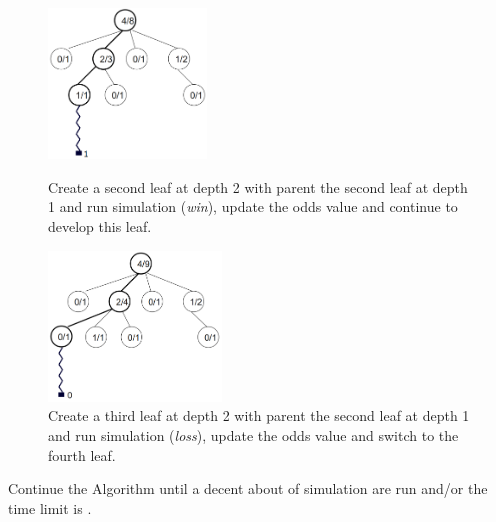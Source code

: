 \begin{figure}[H]
\centering
	\begin{minipage}[b]{0.45\linewidth}
		\centering
		\includegraphics[height=4cm]{1_Presentation/1.2_Algorithm_MCTS_Benoit/img/8.png}
		\caption{\label{fig:8}Create a second leaf at depth 2 with parent the second leaf at depth 1 and run simulation (\textit{win}), update the odds value and continue to develop this leaf.}
	\end{minipage}%
	\hspace*{1cm}
	\begin{minipage}[b]{0.45\linewidth}
		\centering
		\includegraphics[height=4cm]{1_Presentation/1.2_Algorithm_MCTS_Benoit/img/9.png}
		\caption{\label{fig:9}Create a third leaf at depth 2 with parent the second leaf at depth 1 and run simulation (\textit{loss}), update the odds value and switch to the fourth leaf.}
	\end{minipage}%
\end{figure}
\noindent
Continue the Algorithm until a decent about of simulation are run and/or the time limit is .

